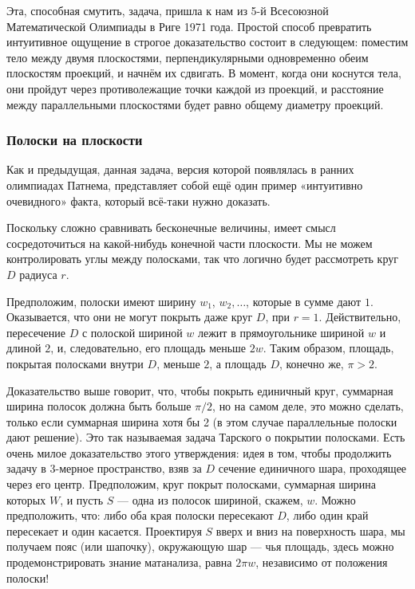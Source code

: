 Эта, способная смутить, задача, пришла к нам из 5-й Всесоюзной Математической Олимпиады в Риге 1971 года.
Простой способ превратить интуитивное ощущение в строгое доказательство состоит в следующем: поместим тело между двумя плоскостями, перпендикулярными одновременно обеим плоскостям проекций, и начнём их сдвигать.
В  момент, когда они коснутся тела, они пройдут через противолежащие точки каждой из проекций, и расстояние между параллельными плоскостями будет равно общему диаметру проекций.
\heart

\subsubsection*{Полоски на плоскости}%

Как и предыдущая, данная задача, версия которой появлялась в ранних олимпиадах Патнема, представляет собой ещё один пример «интуитивно очевидного» факта, который всё-таки нужно доказать.

\medskip

Поскольку сложно сравнивать бесконечные величины, имеет смысл сосредоточиться на какой-нибудь конечной части плоскости.
Мы не можем контролировать углы между полосками, так что логично будет рассмотреть круг $D$ радиуса $r$.

Предположим, полоски имеют ширину $w_1$, $w_2,\dots$, которые в сумме дают $1$.
Оказывается, что они не могут покрыть даже круг $D$, при $r=1$.
Действительно, пересечение $D$ с полоской шириной $w$ лежит в прямоугольнике шириной $w$ и длиной $2$, и, следовательно, его площадь меньше $2w$.
Таким образом, площадь, покрытая полосками внутри $D$, меньше $2$, а площадь $D$, конечно же, $\pi>2$.
\heart 

Доказательство выше говорит, что, чтобы покрыть единичный круг, суммарная ширина полосок должна быть больше $\pi/2$, но на самом деле, это можно сделать, только если суммарная ширина хотя бы 2 (в этом случае параллельные полоски дают решение).
Это так называемая задача Тарского о покрытии полосками.
Есть очень милое доказательство этого утверждения:
идея в том, чтобы продолжить задачу в 3-мерное пространство, взяв за $D$ сечение единичного шара, проходящее через его центр.
Предположим, круг покрыт полосками, суммарная ширина которых $W$, и пусть $S$ --- одна из полосок шириной, скажем, $w$.
Можно предположить, что: либо оба края полоски пересекают $D$, либо один край пересекает и один касается.
Проектируя $S$ вверх и вниз на поверхность шара, мы получаем пояс (или шапочку),
окружающую шар --- чья площадь, здесь можно продемонстрировать знание матанализа, равна 
$2\pi w$, независимо от положения полоски!

